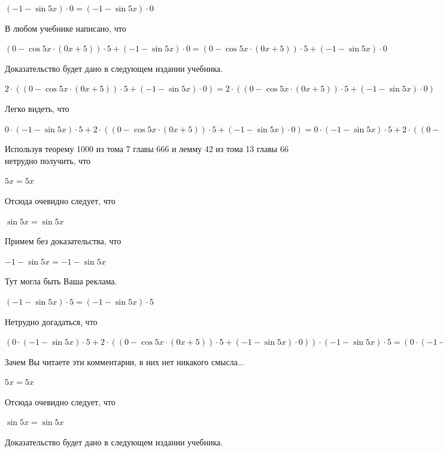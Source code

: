 \documentclass[12pt,a4paper,fleqn]{article}
\theoremstyle{definition}
\begin{document}
$( -1  - \sin 5  x ) \cdot  0  = ( -1  - \sin 5  x ) \cdot  0 $

В любом учебнике написано, что 

$( 0  - \cos 5  x  \cdot ( 0  x  +  5 )) \cdot  5  + ( -1  - \sin 5  x ) \cdot  0  = ( 0  - \cos 5  x  \cdot ( 0  x  +  5 )) \cdot  5  + ( -1  - \sin 5  x ) \cdot  0 $

Доказательство будет дано в следующем издании учебника. 

$ 2  \cdot (( 0  - \cos 5  x  \cdot ( 0  x  +  5 )) \cdot  5  + ( -1  - \sin 5  x ) \cdot  0 ) =  2  \cdot (( 0  - \cos 5  x  \cdot ( 0  x  +  5 )) \cdot  5  + ( -1  - \sin 5  x ) \cdot  0 )$

Легко видеть, что 

$ 0  \cdot ( -1  - \sin 5  x ) \cdot  5  +  2  \cdot (( 0  - \cos 5  x  \cdot ( 0  x  +  5 )) \cdot  5  + ( -1  - \sin 5  x ) \cdot  0 ) =  0  \cdot ( -1  - \sin 5  x ) \cdot  5  +  2  \cdot (( 0  - \cos 5  x  \cdot ( 0  x  +  5 )) \cdot  5  + ( -1  - \sin 5  x ) \cdot  0 )$

Используя теорему 1000 из тома 7 главы 666 и лемму 42 из тома 13 главы 66 нетрудно получить, что 

$ 5  x  =  5  x $

Отсюда очевидно следует, что 

$\sin 5  x  = \sin 5  x $

Примем без доказательства, что 

$ -1  - \sin 5  x  =  -1  - \sin 5  x $

Тут могла быть Ваша реклама. 

$( -1  - \sin 5  x ) \cdot  5  = ( -1  - \sin 5  x ) \cdot  5 $

Нетрудно догадаться, что 

$( 0  \cdot ( -1  - \sin 5  x ) \cdot  5  +  2  \cdot (( 0  - \cos 5  x  \cdot ( 0  x  +  5 )) \cdot  5  + ( -1  - \sin 5  x ) \cdot  0 )) \cdot ( -1  - \sin 5  x ) \cdot  5  = ( 0  \cdot ( -1  - \sin 5  x ) \cdot  5  +  2  \cdot (( 0  - \cos 5  x  \cdot ( 0  x  +  5 )) \cdot  5  + ( -1  - \sin 5  x ) \cdot  0 )) \cdot ( -1  - \sin 5  x ) \cdot  5 $

Зачем Вы читаете эти комментарии, в них нет никакого смысла... 

$ 5  x  =  5  x $

Отсюда очевидно следует, что 

$\sin 5  x  = \sin 5  x $

Доказательство будет дано в следующем издании учебника. 
\end{document}
